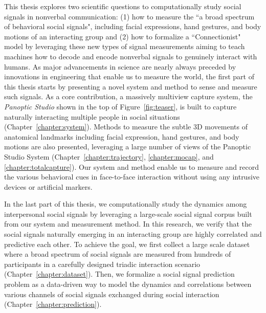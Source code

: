 This thesis explores two scientific questions to computationally study social signals in nonverbal communication: (1) how to measure the ``a broad spectrum of behavioral social signals", including facial expressions, hand gestures, and body motions of an interacting group and (2) how to formalize a ``Connectionist" model by leveraging these new types of signal measurements aiming to teach machines how to decode and encode nonverbal signals to genuinely interact with humans. As major advancements in science are nearly always preceded by innovations in engineering that enable us to measure the world, the first part of this thesis starts by presenting a novel system and method to sense and measure such signals. As a core contribution, a massively multiview capture system, the \emph{Panoptic Studio} shown in the top of Figure~\ref{fig:teaser}, is built to capture naturally interacting multiple people in social situations (Chapter~\ref{chapter:system}). Methods to measure the subtle 3D movements of anatomical landmarks including facial expression, hand gestures, and body motions are also presented, leveraging a large number of views of the Panoptic Studio System (Chapter~\ref{chapter:trajectory}, \ref{chapter:mocap}, and  \ref{chapter:totalcapture}). Our system and method enable us to measure and record the various behavioral cues in face-to-face interaction without using any intrusive devices or artificial markers.


In the last part of this thesis, we computationally study the dynamics among interpersonal social signals by leveraging a large-scale social signal corpus built from our system and measurement method. In this research, we verify that the social signals naturally emerging in an interacting group are highly correlated and predictive each other. To achieve the goal, we first collect a large scale dataset where a broad spectrum of social signals are measured from hundreds of participants in a carefully designed triadic interaction scenario (Chapter~\ref{chapter:dataset}). Then, we formalize a social signal prediction problem as a data-driven way to model the dynamics and correlations between various channels of social signals exchanged during social interaction (Chapter~\ref{chapter:prediction}). %

